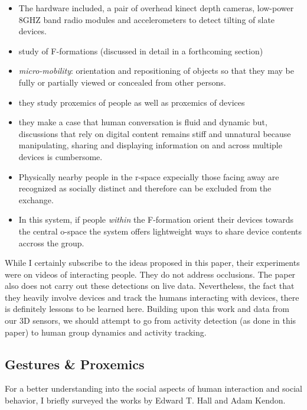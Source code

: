 \begin{itemize}
\item The hardware included, a pair of overhead kinect depth cameras,
  low-power 8GHZ band radio modules and accelerometers to detect tilting
  of slate devices.
\item study of F-formations (discussed in detail in a forthcoming
  section)
\item \emph{micro-mobility}: orientation and repositioning of objects
  so that they may be fully or partially viewed or concealed from
  other persons.
\item they study proxemics of people as well as proxemics of devices
\item they make a case that human conversation is fluid and dynamic but,
  discussions that rely on digital content remains stiff and
  unnatural because manipulating, sharing and displaying
  information on and across multiple devices is cumbersome.
\item Physically nearby people in the r-space expecially those
  facing away are recognized as socially distinct and therefore
  can be excluded from the exchange.
\item In this system, if people \emph{within} the F-formation orient
  their devices towards the central o-space the system offers
  lightweight ways to share device contents accross the group.
\end{itemize}

While I certainly subscribe to the ideas proposed in this paper, their
experiments were on videos of interacting people. They do not address
occlusions. The paper also does not carry out these detections on live
data. Nevertheless, the fact that they heavily involve devices and
track the humans interacting with devices, there is definitely lessons
to be learned here. Building upon this work and data from our 3D
sensors, we should attempt to go from activity detection (as done in
this paper) to human group dynamics and activity tracking.


\subsection{Gestures \& Proxemics}
For a better understanding into the social aspects of human
interaction and social behavior, I briefly surveyed the works by
Edward T. Hall and Adam Kendon.

